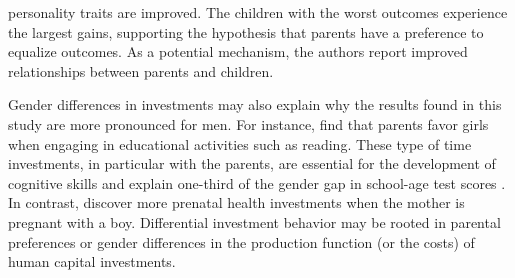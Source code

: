 personality traits are improved. The children with the worst outcomes experience the largest gains, supporting the hypothesis that parents have a preference to equalize outcomes. As a potential mechanism, the authors report improved relationships between parents and children.







	
Gender differences in investments may also explain why the results found in this study are more pronounced for men. For instance, \cite{baker2016} find that parents favor girls when engaging in educational activities such as reading. These type of time investments, in particular with the parents, are essential for the development of cognitive skills \citep{fiorini2014allocation} and explain one-third of the gender gap in school-age test scores \citep{baker2016}. In contrast, \cite{bharadwaj2013discrimination} discover more prenatal health investments when the mother is pregnant with a boy. Differential investment behavior may be rooted in parental preferences or gender differences in the production function (or the costs) of human capital investments.









